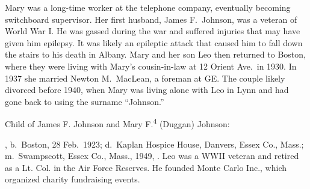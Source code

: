 Mary was a long-time worker at the telephone company, eventually becoming switchboard supervisor.\cite{Mary4DugganPhone} Her first husband, James F.\ Johnson, was a veteran of World War I. He was gassed during the war and suffered injuries that may have given him epilepsy. It was likely an epileptic attack that caused him to fall down the stairs to his death in Albany.\cite{JamesJohnsonFall} Mary and her son Leo then returned to Boston, where they were living with Mary's cousin-in-law at 12 Orient Ave.\ in 1930.\cite{Census1930Mary4Duggan} In 1937 she married Newton M.\ MacLean, a foreman at GE.\cite{Mary4Duggan1939} The couple likely divorced before 1940, when Mary was living alone with Leo in Lynn and had gone back to using the surname ``Johnson.''\cite{Census1940Mary4Duggan}

\begin{KidsIntro}
	Child of James F. Johnson and Mary F.\textsuperscript{4} (Duggan) Johnson:
\end{KidsIntro}

\begin{Kids}
	
	, b.\ Boston, 28 Feb.\ 1923;\cite{Leo5JohnsonBirth} d.\ Kaplan Hospice House, Danvers, Essex Co., Mass.;\cite{Leo5JohnsonObit:1} m.\ Swampscott, Essex Co., Mass., 1949, .\cite{MargaretLangfordMarriage} Leo was a WWII veteran and retired as a Lt. Col. in the Air Force Reserves. He founded Monte Carlo Inc., which organized charity fundraising events.\cite{Leo5JohnsonObit:2}
	
\end{Kids}
